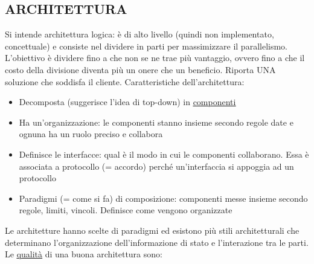		\subsection{ARCHITETTURA}	 \label{architettura}
		Si intende architettura logica: è di alto livello (quindi non implementato, concettuale) e consiste nel dividere in parti per massimizzare il parallelismo. L'obiettivo è dividere fino a che non se ne trae più vantaggio, ovvero fino a che il costo della divisione diventa più un onere che un beneficio.
		Riporta UNA soluzione che soddisfa il cliente.
		Caratteristiche dell'architettura:
		\begin{itemize}
			\item Decomposta (suggerisce l'idea di top-down) in \underline{\hyperref[componente]{componenti}}
			\item Ha un'organizzazione: le componenti stanno insieme secondo regole date e ognuna ha un ruolo preciso e collabora
			\item Definisce le interfacce: qual è il modo in cui le componenti collaborano. Essa è associata a protocollo (= accordo) perché un'interfaccia si appoggia ad un protocollo
			\item Paradigmi (= come si fa) di composizione: componenti messe insieme secondo regole, limiti, vincoli. Definisce come vengono organizzate
		\end{itemize}
		Le architetture hanno scelte di paradigmi ed esistono più stili architetturali che determinano l'organizzazione dell'informazione di stato e l'interazione tra le parti. \\
		Le \underline{\hyperref[qualita]{qualità}} di una buona architettura sono: %
